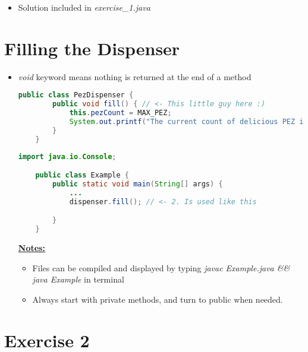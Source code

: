 \documentclass[12pt]{article}
\begin{document}
\bigskip

\begin{itemize}
    \item Solution included in \textit{exercise\_1.java}
\end{itemize}

\bigskip

\section{Filling the Dispenser}

\bigskip

\begin{itemize}
    \item \textit{void} keyword means nothing is returned at the end of a method

    \begin{lstlisting}[language=Java,caption={lesson\_3/PezDispenser.java}]
    public class PezDispenser {
        public void fill() { // <- This little guy here :)
            this.pezCount = MAX_PEZ;
            System.out.printf("The current count of delicious PEZ is %d\n", this.pezCount);
        }
    }
    \end{lstlisting}

    \begin{lstlisting}[language=Java,caption={lesson\_3/Example.java}]
    import java.io.Console;

    public class Example {
        public static void main(String[] args) {
            ...
            dispenser.fill(); // <- 2. Is used like this

        }
    }
    \end{lstlisting}

    \bigskip

    \underline{\textbf{Notes:}}

    \bigskip

    \begin{itemize}
        \item Files can be compiled and displayed by typing \textit{javac Example.java \&\& java Example}
        in terminal
        \item Always start with private methods, and turn to public when needed.
    \end{itemize}
\end{itemize}

\bigskip

\section{Exercise 2}
\end{document}
